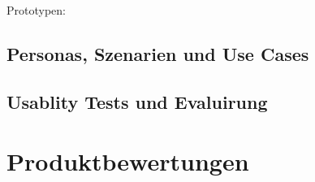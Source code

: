 Prototypen:





\subsection{Personas, Szenarien und Use Cases}




\subsection{Usablity Tests und Evaluirung}

\section{Produktbewertungen}




